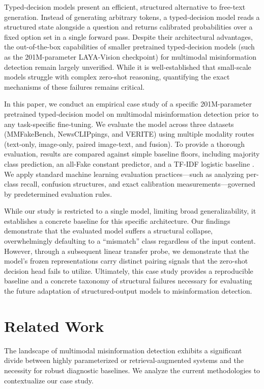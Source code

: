 \documentclass{article} %
\begin{document}
Typed-decision models present an efficient, structured alternative to free-text generation. Instead of generating arbitrary tokens, a typed-decision model reads a structured state alongside a question and returns calibrated probabilities over a fixed option set in a single forward pass. Despite their architectural advantages, the out-of-the-box capabilities of smaller pretrained typed-decision models (such as the 201M-parameter LAYA-Vision checkpoint) for multimodal misinformation detection remain largely unverified. While it is well-established that small-scale models struggle with complex zero-shot reasoning, quantifying the exact mechanisms of these failures remains critical.

In this paper, we conduct an empirical case study of a specific 201M-parameter pretrained typed-decision model on multimodal misinformation detection prior to any task-specific fine-tuning. We evaluate the model across three datasets (MMFakeBench, NewsCLIPpings, and VERITE) using multiple modality routes (text-only, image-only, paired image-text, and fusion). To provide a thorough evaluation, results are compared against simple baseline floors, including majority class prediction, an all-Fake constant predictor, and a TF-IDF logistic baseline \citep{Pedregosa2011ScikitlearnMachine}. We apply standard machine learning evaluation practices---such as analyzing per-class recall, confusion structures, and exact calibration measurements---governed by predetermined evaluation rules.

While our study is restricted to a single model, limiting broad generalizability, it establishes a concrete baseline for this specific architecture. Our findings demonstrate that the evaluated model suffers a structural collapse, overwhelmingly defaulting to a ``mismatch'' class regardless of the input content. However, through a subsequent linear transfer probe, we demonstrate that the model's frozen representations carry distinct pairing signals that the zero-shot decision head fails to utilize. Ultimately, this case study provides a reproducible baseline and a concrete taxonomy of structural failures necessary for evaluating the future adaptation of structured-output models to misinformation detection.

\section{Related Work}
\label{sec:related_work}
The landscape of multimodal misinformation detection exhibits a significant divide between highly parameterized or retrieval-augmented systems and the necessity for robust diagnostic baselines. We analyze the current methodologies to contextualize our case study.
\end{document}
